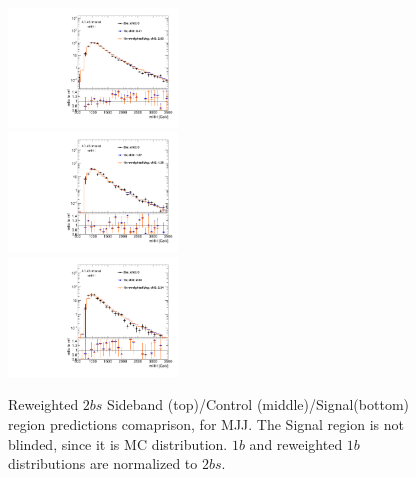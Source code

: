 \begin{figure}[htbp!]
\begin{center}
\includegraphics[width=0.4\textwidth,angle=-90]{figures/boosted/AppendixReweight/Compare/Dijet_Sideband_directcompare_mHH_l_1.pdf}\\
\includegraphics[width=0.4\textwidth,angle=-90]{figures/boosted/AppendixReweight/Compare/Dijet_Control_directcompare_mHH_l_1.pdf}\\
\includegraphics[width=0.4\textwidth,angle=-90]{figures/boosted/AppendixReweight/Compare/Dijet_Signal_directcompare_mHH_l_1.pdf}
\caption{Reweighted $2bs$ Sideband (top)/Control (middle)/Signal(bottom) region predictions comaprison, for MJJ. The Signal region is not blinded, since it is MC distribution. $1b$ and reweighted $1b$ distributions are normalized to $2bs$.}
\label{fig:app-rw-comp-dijet-2bs}
\end{center}
\end{figure}

